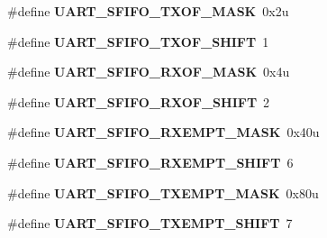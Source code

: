 \begin{DoxyCompactItemize}
\item 
\#define {\bfseries U\+A\+R\+T\+\_\+\+S\+F\+I\+F\+O\+\_\+\+T\+X\+O\+F\+\_\+\+M\+A\+SK}~0x2u\hypertarget{group__UART__Register__Masks_ga53e9575053054705318b25e04c5b0f62}{}\label{group__UART__Register__Masks_ga53e9575053054705318b25e04c5b0f62}

\item 
\#define {\bfseries U\+A\+R\+T\+\_\+\+S\+F\+I\+F\+O\+\_\+\+T\+X\+O\+F\+\_\+\+S\+H\+I\+FT}~1\hypertarget{group__UART__Register__Masks_ga8bcebdd37ab0f89f58d3533577756444}{}\label{group__UART__Register__Masks_ga8bcebdd37ab0f89f58d3533577756444}

\item 
\#define {\bfseries U\+A\+R\+T\+\_\+\+S\+F\+I\+F\+O\+\_\+\+R\+X\+O\+F\+\_\+\+M\+A\+SK}~0x4u\hypertarget{group__UART__Register__Masks_ga6caec5dcdf0ff7a7498279579ca8003e}{}\label{group__UART__Register__Masks_ga6caec5dcdf0ff7a7498279579ca8003e}

\item 
\#define {\bfseries U\+A\+R\+T\+\_\+\+S\+F\+I\+F\+O\+\_\+\+R\+X\+O\+F\+\_\+\+S\+H\+I\+FT}~2\hypertarget{group__UART__Register__Masks_gab6ac120e58576ef4ff7f368b071c9f63}{}\label{group__UART__Register__Masks_gab6ac120e58576ef4ff7f368b071c9f63}

\item 
\#define {\bfseries U\+A\+R\+T\+\_\+\+S\+F\+I\+F\+O\+\_\+\+R\+X\+E\+M\+P\+T\+\_\+\+M\+A\+SK}~0x40u\hypertarget{group__UART__Register__Masks_ga672339d2930ef7864126ea9938d2c18d}{}\label{group__UART__Register__Masks_ga672339d2930ef7864126ea9938d2c18d}

\item 
\#define {\bfseries U\+A\+R\+T\+\_\+\+S\+F\+I\+F\+O\+\_\+\+R\+X\+E\+M\+P\+T\+\_\+\+S\+H\+I\+FT}~6\hypertarget{group__UART__Register__Masks_ga437bd92a0e905d88bf92615135b0672f}{}\label{group__UART__Register__Masks_ga437bd92a0e905d88bf92615135b0672f}

\item 
\#define {\bfseries U\+A\+R\+T\+\_\+\+S\+F\+I\+F\+O\+\_\+\+T\+X\+E\+M\+P\+T\+\_\+\+M\+A\+SK}~0x80u\hypertarget{group__UART__Register__Masks_ga50a1813a0e695d319434adaa157a4c3a}{}\label{group__UART__Register__Masks_ga50a1813a0e695d319434adaa157a4c3a}

\item 
\#define {\bfseries U\+A\+R\+T\+\_\+\+S\+F\+I\+F\+O\+\_\+\+T\+X\+E\+M\+P\+T\+\_\+\+S\+H\+I\+FT}~7\hypertarget{group__UART__Register__Masks_ga1856b521baf09271f8085380ef6e1cc5}{}\label{group__UART__Register__Masks_ga1856b521baf09271f8085380ef6e1cc5}


\end{DoxyCompactItemize}
